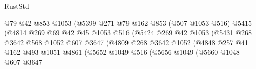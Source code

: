 \begin{lexlean}{RustStd}
\begin{coremodule}
                                        @79
                                        @42
                                        @853
                                        @1053
                                        (@5399
                                          @271
                                          @79
                                          @162
                                          @853
                                          (@507 @1053 @516)
                                          @5415
                                          (@4814
                                            @269
                                            @69
                                            @42
                                            @45
                                            @1053
                                            @516
                                            (@5424
                                              @269
                                              @42
                                              @1053
                                              (@5431
                                                @268
                                                @3642
                                                @568
                                                @1052
                                                @607
                                                @3647
                                                (@4809
                                                  @268
                                                  @3642
                                                  @1052
                                                  (@4848
                                                    @257
                                                    @41
                                                    @162
                                                    @493
                                                    @1051
                                                    @4861
                                                    (@5652
                                                      @1049
                                                      @516
                                                      (@5656
                                                        @1049
                                                        (@5660
                                                          @1048
                                                          @607
                                                          @3647

\end{coremodule}
\end{lexlean}
